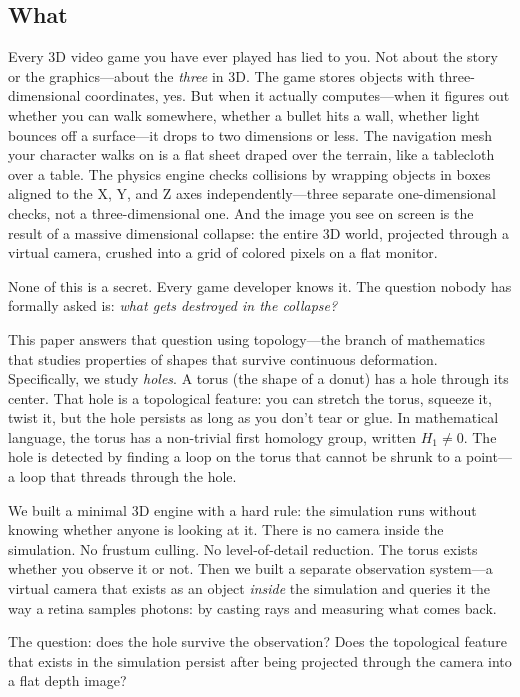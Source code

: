\documentclass[11pt,a4paper]{article}
\theoremstyle{remark}
\begin{document}
\subsection*{What}

Every 3D video game you have ever played has lied to you. Not about the story or the graphics---about the \emph{three} in 3D. The game stores objects with three-dimensional coordinates, yes. But when it actually computes---when it figures out whether you can walk somewhere, whether a bullet hits a wall, whether light bounces off a surface---it drops to two dimensions or less. The navigation mesh your character walks on is a flat sheet draped over the terrain, like a tablecloth over a table. The physics engine checks collisions by wrapping objects in boxes aligned to the X, Y, and Z axes independently---three separate one-dimensional checks, not a three-dimensional one. And the image you see on screen is the result of a massive dimensional collapse: the entire 3D world, projected through a virtual camera, crushed into a grid of colored pixels on a flat monitor.

None of this is a secret. Every game developer knows it. The question nobody has formally asked is: \emph{what gets destroyed in the collapse?}

This paper answers that question using topology---the branch of mathematics that studies properties of shapes that survive continuous deformation. Specifically, we study \emph{holes}. A torus (the shape of a donut) has a hole through its center. That hole is a topological feature: you can stretch the torus, squeeze it, twist it, but the hole persists as long as you don't tear or glue. In mathematical language, the torus has a non-trivial first homology group, written $H_1 \neq 0$. The hole is detected by finding a loop on the torus that cannot be shrunk to a point---a loop that threads through the hole.

We built a minimal 3D engine with a hard rule: the simulation runs without knowing whether anyone is looking at it. There is no camera inside the simulation. No frustum culling. No level-of-detail reduction. The torus exists whether you observe it or not. Then we built a separate observation system---a virtual camera that exists as an object \emph{inside} the simulation and queries it the way a retina samples photons: by casting rays and measuring what comes back.

The question: does the hole survive the observation? Does the topological feature that exists in the simulation persist after being projected through the camera into a flat depth image?
\end{document}

